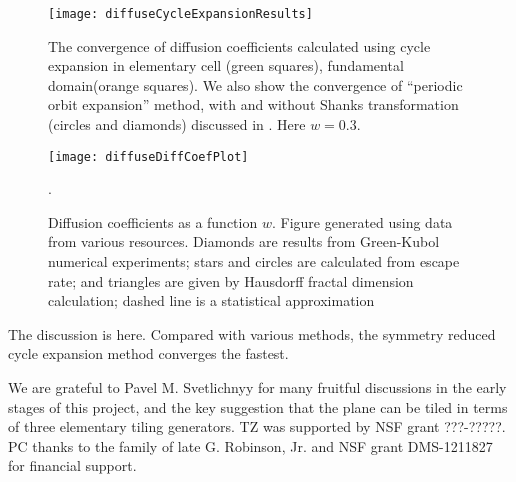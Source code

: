 \documentclass[aps,pre,
                showpacs,
                twocolumn,
                groupedaddress,
                floatfix]{revtex4-1}
\begin{document}
\begin{figure}[htbp]
  \texttt{[image: diffuseCycleExpansionResults]}
  \caption[]{\label{fig-results} The convergence of diffusion coefficients 
  calculated using cycle expansion in elementary cell (green squares), 
  fundamental domain(orange squares). We 
  also show the convergence of ``periodic orbit expansion'' method, with and 
  without Shanks transformation (circles and diamonds) discussed in 
  . Here $w = 0.3$. 
  }
\end{figure}

\begin{figure}
\texttt{[image: diffuseDiffCoefPlot]}
  \caption[]{\label{fig-results} Diffusion coefficients as a function $w$.
  Figure generated using data from various resources. Diamonds are results from
  Green-Kubol numerical experiments; stars and
  circles are calculated from escape rate; and triangles are
  given by Hausdorff fractal dimension calculation; dashed line
  is a statistical approximation}.
\end{figure}
The discussion is here. Compared with various methods, the symmetry reduced 
cycle expansion method converges the fastest.


\begin{acknowledgments}
We are grateful to Pavel M. Svetlichnyy for many fruitful discussions in the
early stages of this project, and the key suggestion that the plane can be tiled
in terms of three elementary tiling generators. TZ was supported by NSF grant
???-?????. PC thanks to the family of late G. Robinson, Jr. and NSF grant
DMS-1211827 for financial support.
\end{acknowledgments}

\ifboyscout
\newpage
    
\fi




% 
\end{document}
